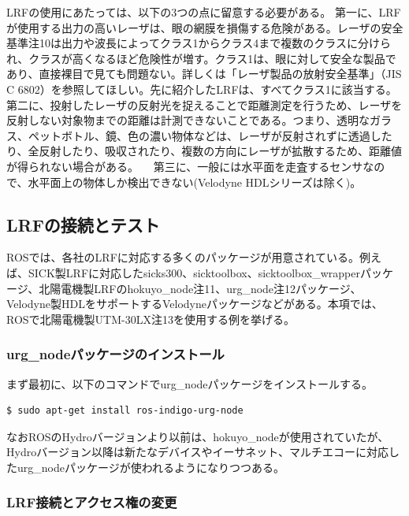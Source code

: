 LRFの使用にあたっては、以下の3つの点に留意する必要がある。
第一に、LRFが使用する出力の高いレーザは、眼の網膜を損傷する危険がある。レーザの安全基準注10は出力や波長によってクラス1からクラス4まで複数のクラスに分けられ、クラスが高くなるほど危険性が増す。クラス1は、眼に対して安全な製品であり、直接裸目で見ても問題ない。詳しくは「レーザ製品の放射安全基準」（JIS C 6802）を参照してほしい。先に紹介したLRFは、すべてクラス1に該当する。
第二に、投射したレーザの反射光を捉えることで距離測定を行うため、レーザを反射しない対象物までの距離は計測できないことである。つまり、透明なガラス、ペットボトル、鏡、色の濃い物体などは、レーザが反射されずに透過したり、全反射したり、吸収されたり、複数の方向にレーザが拡散するため、距離値が得られない場合がある。
　第三に、一般には水平面を走査するセンサなので、水平面上の物体しか検出できない(Velodyne HDLシリーズは除く)。

\subsection{LRFの接続とテスト}

ROSでは、各社のLRFに対応する多くのパッケージが用意されている。例えば、SICK製LRFに対応したsicks300、sicktoolbox、sicktoolbox\_wrapperパッケージ、北陽電機製LRFのhokuyo_node注11、urg_node注12パッケージ、Velodyne製HDLをサポートするVelodyneパッケージなどがある。本項では、ROSで北陽電機製UTM-30LX注13を使用する例を挙げる。

\subsubsection{urg\_nodeパッケージのインストール}

まず最初に、以下のコマンドでurg\_nodeパッケージをインストールする。

\begin{lstlisting}[language=ROS]
$ sudo apt-get install ros-indigo-urg-node
\end{lstlisting}

なおROSのHydroバージョンより以前は、hokuyo\_nodeが使用されていたが、Hydroバージョン以降は新たなデバイスやイーサネット、マルチエコーに対応したurg\_nodeパッケージが使われるようになりつつある。

\subsubsection{LRF接続とアクセス権の変更}


